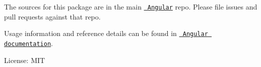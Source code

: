 The sources for this package are in the main \href{https://github.com/angular/angular}{\texttt{ Angular}} repo. Please file issues and pull requests against that repo.

Usage information and reference details can be found in \href{https://angular.io/docs}{\texttt{ Angular documentation}}.

License\+: MIT 